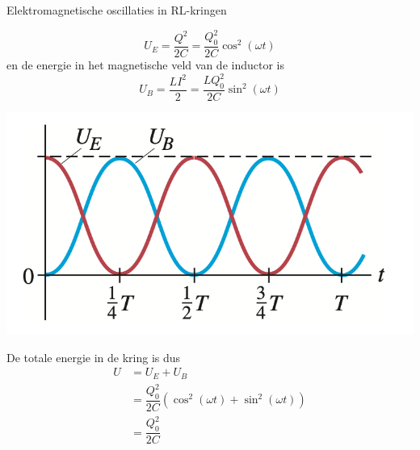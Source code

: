 \begin{app}{Elektromagnetische oscillaties in RL-kringen}
    \begin{minipage}{.70\textwidth}
        \begin{equation*}
            U_{E} = \dfrac{Q^{2}}{2C} = \dfrac{Q_{0}^2}{2C}\cos^2(\omega t)
        \end{equation*}
        \hspace{-0.6cm} en de energie in het magnetische veld van de inductor is 
        \begin{equation*}
            U_{B} = \dfrac{LI^{2}}{2} = \dfrac{LQ_{0}^2}{2C}\sin^2(\omega t)
        \end{equation*}
    \end{minipage}
    \begin{minipage}{.26\textwidth}
        \vspace{0cm}\hspace{-1.4cm}\includegraphics[scale = 0.4]{Images/Magnetisme/LCKringOscillatie.png} 
    \end{minipage}
    De totale energie in de kring is dus
    \begin{align*}
        U &= U_{E} + U_{B} \\
          &= \dfrac{Q_{0}^2}{2C}\left(\cos^2(\omega t) +\sin^2(\omega t)\right) \\ 
          &= \dfrac{Q_{0}^2}{2C}
    \end{align*}
\end{app}

